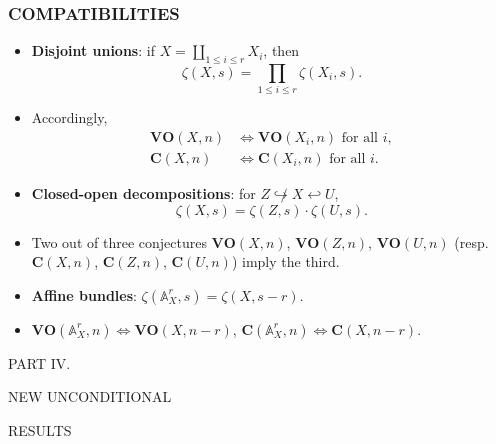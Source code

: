 \documentclass[handout]{beamer}
\renewcommand{\AA}{\mathbb{A}}
\begin{document}
\begin{frame}
  \frametitle{COMPATIBILITIES}

  \begin{itemize}
  \item<2-> \textbf{Disjoint unions}: if
    $X = \coprod_{1 \le i \le r} X_i$, then
    \[ \zeta (X,s) = \prod_{1 \le i \le r} \zeta (X_i,s). \]

  \item<3-> Accordingly,
    \begin{align*}
      \mathbf{VO} (X,n) & \iff \mathbf{VO} (X_i,n)\text{ for all }i, \\
      \mathbf{C} (X,n) & \iff \mathbf{C} (X_i,n)\text{ for all }i.
    \end{align*}

  \item<4-> \textbf{Closed-open decompositions}:
    for $Z \not\hookrightarrow X \hookleftarrow U$,
    \[ \zeta (X,s) = \zeta (Z,s) \cdot \zeta (U,s). \]

  \item<5-> Two out of three conjectures
    $\mathbf{VO} (X,n)$, $\mathbf{VO} (Z,n)$, $\mathbf{VO} (U,n)$
    (resp. $\mathbf{C} (X,n)$, $\mathbf{C} (Z,n)$, $\mathbf{C} (U,n)$)
    imply the third.

  \item<6-> \textbf{Affine bundles}:
    $\zeta (\AA^r_X, s) = \zeta (X, s-r)$.

  \item<7-> $\mathbf{VO} (\AA^r_X, n) \iff \mathbf{VO} (X, n-r)$,
    $\mathbf{C} (\AA^r_X, n) \iff \mathbf{C} (X, n-r)$.
  \end{itemize}
\end{frame}


\begin{frame}[plain]
  \headingfont

  \begin{center}
    {\huge PART IV.

      \vspace{1em}

      NEW UNCONDITIONAL

      \vspace{0.25em}

      RESULTS}
  \end{center}
\end{frame}

\end{document}
